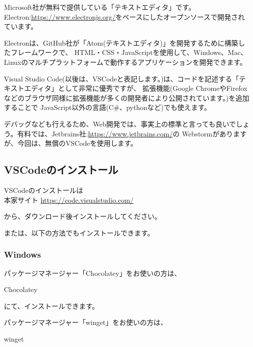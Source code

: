 Microsoft社が無料で提供している「テキストエディタ」です。Electron:\url{https://www.electronjs.org/}をベースにしたオープンソースで開発されています。

Electronは、GitHub社が「Atom(テキストエディタ)」を開発するために構築したフレームワークで、
HTML・CSS・JavaScriptを使用して、Windows、Mac、Linuxのマルチプラットフォームで動作するアプリケーションを開発できます。

Visual Studio Code(以後は、VSCodeと表記します。)は、コードを記述する「テキストエディタ」として非常に優秀ですが、
拡張機能(Google ChromeやFirefoxなどのブラウザ同様に拡張機能が多くの開発者により公開されています。)を追加することで
JavaScript以外の言語(C\#、pythonなど)でも使えます。

デバッグなども行えるため、Web開発では、事実上の標準と言っても良いでしょう。有料では、Jetbrains社:\url{https://www.jetbrains.com/}の
Webstormがありますが、今回は、無償のVSCodeを使用します。

\subsection{VSCodeのインストール}
\keeplastskip{
  \label{sec:1-2-1}
  \par\nobreak
}

VSCodeのインストールは\\[0pt]
本家サイト
\url{https://code.visualstudio.com/}

から、ダウンロード後インストールしてください。

または、以下の方法でもインストールできます。

\subsubsection*{Windows}
\keeplastskip{
  \label{sec:1-2-1-1}
  \par\nobreak
}

パッケージマネージャー「Chocolatey」をお使いの方は、\\[0pt]

\def\startercodeblockfontsize{}
\begin{starterterminal}[]{Chocolatey}\end{starterterminal}

にて、インストールできます。

パッケージマネージャー「winget」をお使いの方は、\\[0pt]

\def\startercodeblockfontsize{}
\begin{starterterminal}[]{winget}\end{starterterminal}

